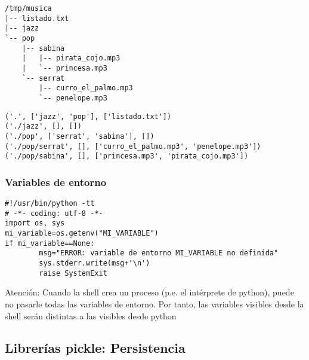 \documentclass[ucs]{beamer}
\begin{document}
\begin{frame}[fragile]

  \begin{scriptsize}
  \begin{verbatim}
/tmp/musica
|-- listado.txt
|-- jazz
`-- pop
    |-- sabina
    |   |-- pirata_cojo.mp3
    |   `-- princesa.mp3
    `-- serrat
        |-- curro_el_palmo.mp3
        `-- penelope.mp3
  \end{verbatim}
  \end{scriptsize}

  \begin{scriptsize}
  \begin{verbatim}
('.', ['jazz', 'pop'], ['listado.txt'])
('./jazz', [], [])
('./pop', ['serrat', 'sabina'], [])
('./pop/serrat', [], ['curro_el_palmo.mp3', 'penelope.mp3'])
('./pop/sabina', [], ['princesa.mp3', 'pirata_cojo.mp3'])
  \end{verbatim}
  \end{scriptsize}

\end{frame}


\begin{frame}[fragile]
\frametitle{Variables de entorno}
  \begin{scriptsize}
  \begin{verbatim}
#!/usr/bin/python -tt
# -*- coding: utf-8 -*-
import os, sys
mi_variable=os.getenv("MI_VARIABLE")
if mi_variable==None:
        msg="ERROR: variable de entorno MI_VARIABLE no definida"
        sys.stderr.write(msg+'\n')
        raise SystemExit
  \end{verbatim}
  \end{scriptsize}
Atención: 
Cuando la shell crea un proceso (p.e. el intérprete de python), puede
no pasarle todas las variables de entorno. Por tanto, las
variables visibles desde la shell serán distintas a las
visibles desde python
\end{frame}


\subsection{Librerías pickle: Persistencia}
\end{document}
